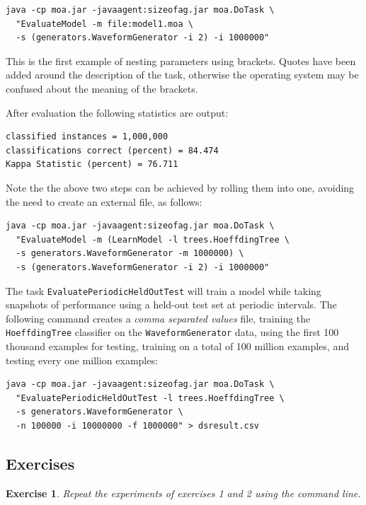 \documentclass[a4paper,12pt]{article}
\newtheorem{exercise}{Exercise}{}
\begin{document}
\begin{verbatim}
java -cp moa.jar -javaagent:sizeofag.jar moa.DoTask \
  "EvaluateModel -m file:model1.moa \
  -s (generators.WaveformGenerator -i 2) -i 1000000"
\end{verbatim}

This is the first example of nesting parameters using brackets. Quotes have been added around the description of the task, otherwise the operating system may be confused about the meaning of the brackets.

After evaluation the following statistics are output:

\begin{verbatim}
classified instances = 1,000,000
classifications correct (percent) = 84.474
Kappa Statistic (percent) = 76.711
\end{verbatim}

Note the the above two steps can be achieved by rolling them into one, avoiding the need to create an external file, as follows:

\begin{verbatim}
java -cp moa.jar -javaagent:sizeofag.jar moa.DoTask \
  "EvaluateModel -m (LearnModel -l trees.HoeffdingTree \
  -s generators.WaveformGenerator -m 1000000) \
  -s (generators.WaveformGenerator -i 2) -i 1000000"
\end{verbatim}

The task \verb+EvaluatePeriodicHeldOutTest+ will train a model while taking snapshots of performance using a held-out test set at periodic intervals.
The following command creates a {\em comma separated values} file, training the \verb+HoeffdingTree+ classifier on the \verb+WaveformGenerator+ data, using the first 100 thousand examples for testing, training on a total of 100 million examples, and testing every one million examples:

\begin{verbatim}
java -cp moa.jar -javaagent:sizeofag.jar moa.DoTask \
  "EvaluatePeriodicHeldOutTest -l trees.HoeffdingTree \
  -s generators.WaveformGenerator \
  -n 100000 -i 10000000 -f 1000000" > dsresult.csv
\end{verbatim}

\subsection{Exercises}
\begin{exercise}
Repeat the experiments of exercises 1 and 2 using the command line.  
\end{exercise}
\end{document}
